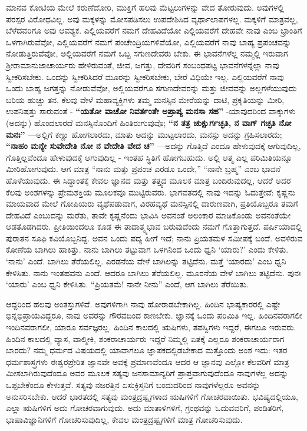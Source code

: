 ಮಾನವ ಕೋಟಿಯ ಮೇಲೆ ಕರುಣೆದೋರಿ, ಮುಕ್ತಿಗೆ ಹಲವು ಮೆಟ್ಟಲುಗಳನ್ನು ವೇದ ತೋರುವುದು. ಅವುಗಳಲ್ಲಿ ಪರಸ್ಪರ ವಿರೋಧವಿಲ್ಲ. ಅವು ಮಕ್ಕಳನ್ನು ಮೋಸಪಡಿಸಲು ಉಪದೇಶಿಸಿದ ವ್ಯರ್ಥಾಲಾಪಗಳಲ್ಲ. ಮಕ್ಕಳಿಗೆ ಮಾತ್ರವಲ್ಲ, ಬೆಳೆದವರಿಗೂ ಅವು ಆವಶ್ಯಕ. ಎಲ್ಲಿಯವರೆಗೆ ನಮಗೆ ದೇಹವಿದೆಯೋ ಎಲ್ಲಿಯವರೆಗೆ ದೇಹವೇ ನಾವು ಎಂಬ ಭ್ರಾಂತಿಗೆ ಒಳಗಾಗಿರುವೆವೋ, ಎಲ್ಲಿಯವರೆಗೆ ನಮಗೆ ಪಂಚೇಂದ್ರಿಯಗಳಿವೆಯೋ, ಎಲ್ಲಿಯವರೆಗೆ ನಾವು ಬಾಹ್ಯ ಪ್ರಪಂಚವನ್ನು ನೋಡುತ್ತಿರುವೆವೋ, ಅಲ್ಲಿಯವರೆಗೆ ನಮಗೆ ಒಬ್ಬ ಸಗುಣದೇವರು ಬೇಕು. ಈ ಭಾವನೆಗಳೆಲ್ಲ ನಮ್ಮಲ್ಲಿ ಇರುವಾಗ ಶ‍್ರೀರಾಮಾನುಜಾಚಾರ್ಯರು ಹೇಳಿರುವಂತೆ, ಜೀವ, ಜಗತ್ತು, ದೇವರಿಗೆ ಸಂಬಂಧಪಟ್ಟ ಭಾವನೆಗಳನ್ನೆಲ್ಲಾ ನಾವು ಸ್ವೀಕರಿಸಬೇಕು. ಒಂದನ್ನು ಸ್ವೀಕರಿಸಿದರೆ ಮೂರನ್ನು ಸ್ವೀಕರಿಸಬೇಕು, ಬೇರೆ ವಿಧಿಯೇ ಇಲ್ಲ. ಎಲ್ಲಿಯವರೆಗೆ ನಾವು ಒಂದು ಬಾಹ್ಯ ಜಗತ್ತನ್ನು ನೋಡುವೆವೋ, ಅಲ್ಲಿಯವರೆಗೂ ಸಗುಣದೇವರನ್ನು ಮತ್ತು ಜೀವವನ್ನು ಅಲ್ಲಗಳೆಯುವುದು ಬರಿಯ ಹುಚ್ಚು ತನ. ಕೆಲವು ವೇಳೆ ಮಹಾವ್ಯಕ್ತಿಗಳು ತಮ್ಮ ಮನಸ್ಸಿನ ಮೇರೆಯನ್ನು ದಾಟಿ, ಪ್ರಕೃತಿಯನ್ನು ಮೀರಿ, ಉಪನಿಷತ್ತು ಸಾರುವಂತೆ - \textbf{“ಯತೋ ವಾಚೋ ನಿವರ್ತಂತೇ ಅಪ್ರಾಪ್ಯ ಮನಸಾ ಸಹ”} -ಯಾವುದರಿಂದ ವಾಕ್ಕುಗಳು (ಅದನ್ನು) ಹೊಂದಲಾರದೆ ಮನಸ್ಸಿನೊಂದಿಗೆ ಹಿಂತಿರುಗುವುವೊ; \textbf{“ನ ತತ್ರ ಚುಕ್ಷುರ್ಗಚ್ಛತಿ, ನ ವಾಗ್​ ಗಚ್ಛತಿ ನೋ ಮನಃ”} —ಅಲ್ಲಿಗೆ ಕಣ್ಣು ಹೋಗಲಾರದು, ಮಾತು ಅದನ್ನು ಮುಟ್ಟಲಾರದು, ಮನಸ್ಸು ಅದನ್ನು ಗ್ರಹಿಸಲಾರದು; \textbf{“ನಾಹಂ ಮನ್ಯೇ ಸುವೇದೇತಿ ನೋ ನ ವೇದೇತಿ ವೇದ ಚ”} —ಅದನ್ನು ಗೊತ್ತಿದೆ ಎಂದೂ ಹೇಳುವುದಕ್ಕೆ ಆಗುವುದಿಲ್ಲ, ಗೊತ್ತಿಲ್ಲವೆಂದೂ ಹೇಳುವುದಕ್ಕೆ ಆಗುವುದಿಲ್ಲ - ಇಂತಹ ಸ್ಥಿತಿಗೆ ಹೋಗಬಹುದು. ಅಲ್ಲಿ ಆತ್ಮ ಎಲ್ಲ ಪರಿಮಿತಿಯನ್ನೂ ಮೀರಿಹೋಗುವುದು. ಆಗ ಮಾತ್ರ “ನಾನು ಮತ್ತು ಪ್ರಪಂಚ ಎರಡೂ ಒಂದೇ,” “ನಾನೇ ಬ್ರಹ್ಮ” ಎಂಬ ಭಾವನೆ ಹೊಳೆಯುವುದು. ಈ ಸಿದ್ಧಾಂತಕ್ಕೆ ಕೇವಲ ಜ್ಞಾನದ ಮತ್ತು ತತ್ತ್ವದ ಮೂಲಕ ಮಾತ್ರ ಬಂದಿರುವುದಲ್ಲ, ಆದರೆ ಅದರ ಕೆಲವು ಅಂಶಗಳನ್ನು ಪ್ರೇಮಶಕ್ತಿಯ ಮೂಲಕವೂ ಮುಟ್ಟಿರುವರು. ಭಾಗವತದಲ್ಲಿ ನಾವು ಇದನ್ನು ಓದುತ್ತೇವೆ: ಕೃಷ್ಣನು ಮಾಯವಾದ ಮೇಲೆ ಗೋಪಿಯರು ವ್ಯಥೆಪಡುವಾಗ, ವಿರಹವ್ಯಥೆ ಮನಸ್ಸಿನಲ್ಲಿ ದಾರುಣವಾಗಿ, ಪ್ರತಿಯೊಬ್ಬರೂ ತಮಗೆ ದೇಹವಿದೆ ಎಂಬುದನ್ನು ಮರೆತು, ತಾವೇ ಕೃಷ್ಣನೆಂದು ಭಾವಿಸಿ ಅವನಂತೆ ಅಲಂಕಾರ ಮಾಡಿಕೊಂಡು ಅವನಂತೆಯೇ ಆಡತೊಡಗಿದರು. ಪ್ರೀತಿಯಿಂದಲೂ ಕೂಡ ಈ ತಾದಾತ್ಮ್ಯಭಾವ ಬರುವುದೆಂದು ನಮಗೆ ಗೊತ್ತಾಗುತ್ತದೆ. ಪರ್ಷಿಯಾದಲ್ಲಿ ಪುರಾತನ ಸೂಫಿ ಕವಿಯೊಬ್ಬನಿದ್ದ. ಅವನ ಒಂದು ಪದ್ಯ ಹೀಗೆ ಇದೆ; ನಾನು ಪ್ರಿಯತಮಳ ಸಮೀಪಕ್ಕೆ ಬಂದೆ. ಅವಳಿರುವ ಕೋಣೆಯ ಬಾಗಿಲು ಹಾಕಿತ್ತು. ನಾನು ಬಾಗಿಲು ತಟ್ಟುವಾಗ ಒಳಗಿನಿಂದ ಒಂದು ಧ್ವನಿ ‘ಯಾರು?’ ಎಂದು ಕೇಳಿತು. ‘ನಾನು’ ಎಂದೆ. ಬಾಗಿಲು ತೆರೆಯಲಿಲ್ಲ. ಎರಡನೆಯ ವೇಳೆ ಬಾಗಿಲನ್ನು ತಟ್ಟಿದೆನು. ಮತ್ತೆ ‘ಯಾರದು’ ಎಂಬ ಧ್ವನಿ ಕೇಳಿಸಿತು. ನಾನು ಇಂತಹವನು ಎಂದೆ. ಆದರೂ ಬಾಗಿಲು ತೆರೆಯಲಿಲ್ಲ. ಮೂರನೆಯ ವೇಳೆ ಬಾಗಿಲು ತಟ್ಟಿದೆನು. ಪುನಃ ‘ಯಾರು’ ಎಂಬ ಧ್ವನಿ ಕೇಳಿಸಿತು. “ಪ್ರಿಯತಮೆ! ನಾನೇ ನೀನು” ಎಂದೆ, ಆಗ ಬಾಗಿಲು ತೆರೆಯಿತು.

ಆದ್ದರಿಂದ ಹಲವು ಅಂತಸ್ತುಗಳಿವೆ. ಅವುಗಳಿಗಾಗಿ ನಾವು ಹೋರಾಡಬೇಕಾಗಿಲ್ಲ. ಹಿಂದಿನ ಭಾಷ್ಯಕಾರರಲ್ಲಿ ಎಷ್ಟೇ ಭಿನ್ನಭಿಪ್ರಾಯವಿದ್ದರೂ, ನಾವು ಅವರನ್ನು ಗೌರವದಿಂದ ಕಾಣಬೇಕು. ಜ್ಞಾನಕ್ಕೆ ಒಂದು ಪರಿಮಿತಿ ಇಲ್ಲ. ಹಿಂದಿನವರಾಗಲೀ ಇಂದಿನವರಾಗಲೀ, ಯಾರೂ ಸರ್ವಜ್ಞರಲ್ಲ. ಹಿಂದಿನ ಕಾಲದಲ್ಲಿ ಋಷಿಗಳು, ತಪಸ್ವಿಗಳು ಇದ್ದರೆ, ಈಗಲೂ ಇರುವರು. ಹಿಂದಿನ ಕಾಲದಲ್ಲಿ ವ್ಯಾಸ, ವಾಲ್ಮೀಕಿ, ಶಂಕರಾಚಾರ್ಯರು ಇದ್ದರೆ ನಿಮ್ಮಲ್ಲಿ ಏತಕ್ಕೆ ಎಲ್ಲರೂ ಶಂಕರಾಚಾರ್ಯರಾಗ ಬಾರದು? ನಮ್ಮ ಧರ್ಮದ ವಿಷಯದಲ್ಲಿ ಯಾವಾಗಲೂ ಜ್ಞಾಪಕದಲ್ಲಿಡಬೇಕಾದ ಮತ್ತೊಂದು ಅಂಶ ಇದು: ಇತರ ಧರ್ಮಶಾಸ್ತ್ರಗಳು ಈಶ್ವರಪ್ರೇರಿತ ಜ್ಞಾನವೇ ಅವಕ್ಕೆ ಪ್ರಮಾಣವೆಂದೂ ಆದರ ಆ ಜ್ಞಾನವು ಎಲ್ಲೋ ಕೆಲವರಿಗೆ ಮಾತ್ರ ಮೀಸಲಾಗಿರುವುದೆಂದೂ ಅವರ ಮೂಲಕ ಸತ್ಯವು ಜನಸಾಮಾನ್ಯರಿಗೆ ಪ್ರಾಪ್ತವಾಗುವುದೆಂದೂ ನಾವುಗಳೆಲ್ಲ ಅದನ್ನು ಒಪ್ಪಬೇಕೆಂದೂ ಕೇಳುತ್ತವೆ. ಸತ್ಯವು ನಜರತ್ತಿನ ಏಸುಕ್ರಿಸ್ತನಿಗೆ ಬಂದುದರಿಂದ ನಾವುಗಳೆಲ್ಲರೂ ಅವನನ್ನು ಅನುಸರಿಸಬೇಕು. ಆದರೆ ಭಾರತದಲ್ಲಿ ಸತ್ಯವು ಮಂತ್ರದ್ರಷ್ಟೃಗಳಾದ ಋಷಿಗಳಿಗೆ ಗೋಚರವಾಯಿತು. ಭವಿಷ್ಯದಲ್ಲಿಯೂ, ಎಲ್ಲಾ ಋಷಿಗಳಿಗೆ ಅದು ಗೋಚರವಾಗುವುದು. ಅದು ಮಾತಾಳಿಗಳಿಗೆ, ಗ್ರಂಥವನ್ನು ಓದುವವರಿಗೆ, ಪಂಡಿತರಿಗೆ, ಭಾಷಾವಿಜ್ಞಾನಿಗಳಿಗೆ ಗೋಚರಿಸುವುದಿಲ್ಲ, ಕೇವಲ ಮಂತ್ರದ್ರಷ್ಟೃಗಳಿಗೆ ಮಾತ್ರ ಗೋಚರಿಸುವುದು.

